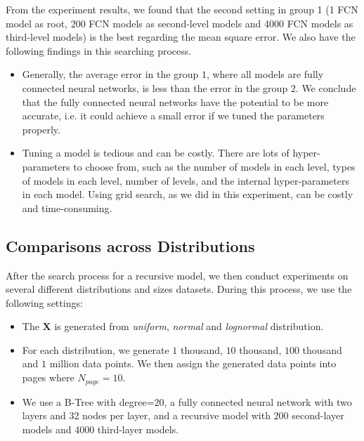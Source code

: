 \begin{figure}
	
\end{figure}

From the experiment results, we found that the second setting in group 1 (1 FCN model as root, 200 FCN models as second-level models and 4000 FCN models as third-level models) is the best regarding the mean square error. We also have the following findings in this searching process.

\begin{itemize}
	\item Generally, the average error in the group $1$, where all models are fully connected neural networks, is less than the error in the group $2$. We conclude that the fully connected neural networks have the potential to be more accurate, i.e. it could achieve a small error if we tuned the parameters properly.
	\item Tuning a model is tedious and can be costly. There are lots of hyper-parameters to choose from, such as the number of models in each level, types of models in each level, number of levels, and the internal hyper-parameters in each model. Using grid search, as we did in this experiment, can be costly and time-consuming.
\end{itemize}

\subsection{Comparisons across Distributions}

After the search process for a recursive model, we then conduct experiments on several different distributions and sizes datasets. During this process, we use the following settings:

\begin{itemize}
	\item The $\boldsymbol{X}$ is generated from \textit{uniform}, \textit{normal} and \textit{lognormal} distribution.
	\item For each distribution, we generate $1$ thousand, $10$ thousand, $100$ thousand and $1$ million data points. We then assign the generated data points into pages where $N_{page}=10$.
	\item We use a B-Tree with degree=$20$, a fully connected neural network with two layers and 32 nodes per layer, and a recursive model with 200 second-layer models and 4000 third-layer models.
\end{itemize}


